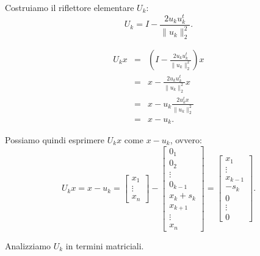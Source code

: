 Costruiamo il riflettore elementare $U_k$:
\[U_k = I - \frac{2u_ku_k^t}{\| u_k \|_2^2}.\]

\[
\begin{array}{lcl}
 U_kx & = & \left(I - \frac{2u_ku_k^t}{\| u_k \|_2^2}\right)x \\
 & = & x - \frac{2u_ku_k^t}{\| u_k \|_2^2}x \\
 & = & x - u_k\frac{2u_k^tx}{\| u_k \|_2^2} \\
 & = & x - u_k.
 \end{array}
\]

Possiamo quindi esprimere $U_kx$ come $ x - u_k$, ovvero:
\[U_kx = x - u_k =
\left[
\begin{array}{c}
x_1 \\
\vdots \\
x_n
\end{array}\right] -
\left[
\begin{array}{c}
0_1 \\
0_2 \\
\vdots \\
0_{k-1} \\
x_k + s_k\\
x_{k+1} \\
\vdots \\
x_n
\end{array}\right] =
\left[
\begin{array}{c}
x_1 \\
\vdots \\
x_{k-1} \\
-s_k \\
0 \\
\vdots \\
0
\end{array}\right].
\]

Analizziamo $U_k$ in termini matriciali.

